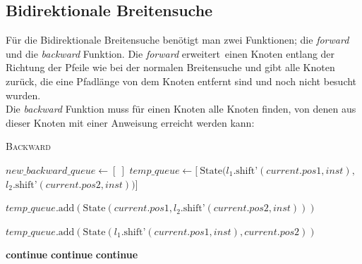 \documentclass[a4paper,10pt,ngerman]{scrartcl}
\begin{document}
    \subsection{Bidirektionale Breitensuche}
    Für die Bidirektionale Breitensuche benötigt man zwei Funktionen; die \textit{forward} und die \textit{backward} Funktion. Die \textit{forward} \glqq erweitert\grqq~einen Knoten entlang der Richtung der Pfeile wie bei der normalen Breitensuche und gibt alle Knoten zurück, die eine Pfadlänge von dem Knoten entfernt sind und noch nicht besucht wurden. \\
    Die \textit{backward} Funktion muss für einen Knoten alle Knoten finden, von denen aus dieser Knoten mit einer Anweisung erreicht werden kann:
    \begin{algorithm}[H]
        \label{backward}
        \caption{\textsc{Backward}}
        \begin{algorithmic}[1]
                \State $\textit{new\_backward\_queue} \gets [\ ]$
                    \State $\textit{temp\_queue} \gets [\ \text{State}(l_1.\text{shift'}(\textit{current.pos1}, \textit{inst}),$
                    \State \hspace{5em}$l_2.\text{shift'}(\textit{current.pos2}, \textit{inst})) ]$

                        \State $\textit{temp\_queue}.\text{add}(\text{State}(\textit{current.pos1}, l_2.\text{shift'}(\textit{current.pos2}, \textit{inst})))$
                    \EndIf

                        \State $\textit{temp\_queue}.\text{add}(\text{State}(l_1.\text{shift'}(\textit{current.pos1}, \textit{inst}), \textit{current.pos2}))$
                    \EndIf

                            \State \textbf{continue}
                        \EndIf
                            \State \textbf{continue}
                        \EndIf
                            \State \textbf{continue}
                        \EndIf


\end{algorithmic}
\end{algorithm}
\end{document}
